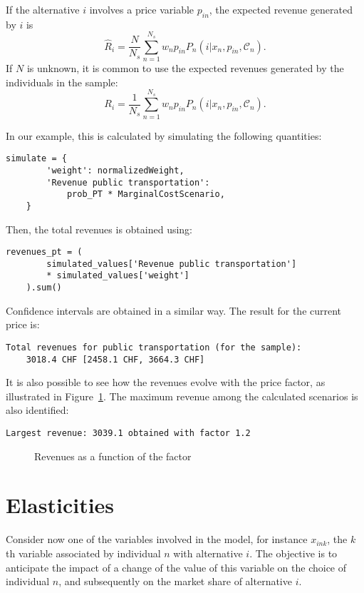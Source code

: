 \documentclass[12pt,a4paper]{article}
\newcommand{\C}{\mathcal{C}}
\begin{document}
If the alternative $i$ involves a price variable $p_{in}$, the expected revenue
generated by $i$ is
\begin{equation}
  \label{eq:revenues_pop}
\widehat{R}_i = \frac{N}{N_s} \sum_{n=1}^{N_s} w_n p_{in} P_n(i|x_n, p_{in}, \C_n).
\end{equation}
If $N$ is unknown, it is common to use the expected revenues
generated by the individuals in the sample:
\begin{equation}
  \label{eq:revenues_sample}
R_i = \frac{1}{N_s} \sum_{n=1}^{N_s} w_n p_{in} P_n(i|x_n, p_{in}, \C_n).
\end{equation}

In our example, this is calculated by simulating the following quantities:
\begin{lstlisting}[style=nonumbers]
    simulate = {
        'weight': normalizedWeight,
        'Revenue public transportation':
            prob_PT * MarginalCostScenario,
    }
\end{lstlisting}
Then, the total revenues is obtained using:
\begin{lstlisting}[style=nonumbers]
    revenues_pt = (
        simulated_values['Revenue public transportation']
        * simulated_values['weight']
    ).sum()
\end{lstlisting}

Confidence intervals are obtained in a similar way. The result for the
current price is:
\begin{lstlisting}[style=nonumbers, keywordstyle=\ttfamily]
Total revenues for public transportation (for the sample):
    3018.4 CHF [2458.1 CHF, 3664.3 CHF]
\end{lstlisting}
It is also possible to see how the revenues evolve with the price
factor, as illustrated in Figure~\ref{fig:revenues}. The maximum
revenue among the calculated scenarios is also identified:

\begin{lstlisting}[style=nonumbers]
Largest revenue: 3039.1 obtained with factor 1.2
\end{lstlisting}

\begin{figure}
\begin{center}

\end{center}
\caption{\label{fig:revenues}Revenues as a function of the factor}
\end{figure}

\section{Elasticities}\label{sec:elasticities}
Consider now one of the variables involved in the model, for instance
$x_{ink}$, the $k$th variable associated by individual $n$ with
alternative $i$. The
objective is to anticipate the impact of a change of the value of this
variable on the choice of individual $n$,  and subsequently on the market share of
alternative $i$.
\end{document}
